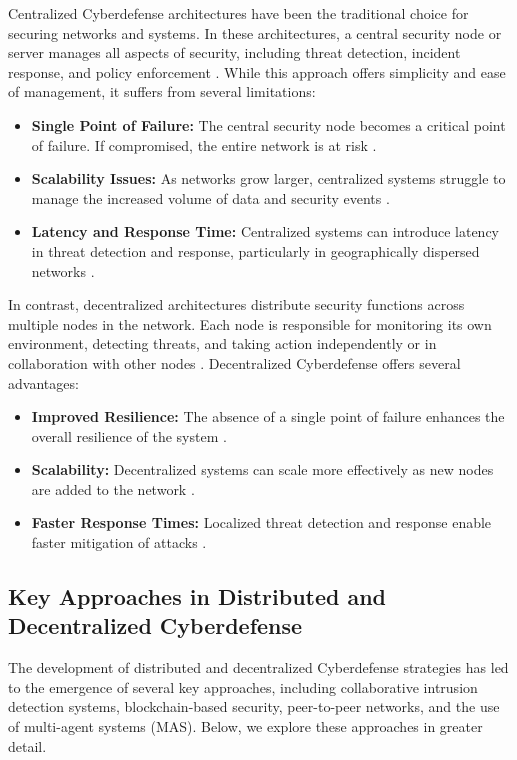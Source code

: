 Centralized Cyberdefense architectures have been the traditional choice for securing networks and systems. In these architectures, a central security node or server manages all aspects of security, including threat detection, incident response, and policy enforcement \cite{Jansen2011}. While this approach offers simplicity and ease of management, it suffers from several limitations:

\begin{itemize}
    \item \textbf{Single Point of Failure:} The central security node becomes a critical point of failure. If compromised, the entire network is at risk \cite{Mell2011}.
    \item \textbf{Scalability Issues:} As networks grow larger, centralized systems struggle to manage the increased volume of data and security events \cite{Xu2019}.
    \item \textbf{Latency and Response Time:} Centralized systems can introduce latency in threat detection and response, particularly in geographically dispersed networks \cite{Benet2014}.
\end{itemize}

In contrast, decentralized architectures distribute security functions across multiple nodes in the network. Each node is responsible for monitoring its own environment, detecting threats, and taking action independently or in collaboration with other nodes \cite{Xu2019}. Decentralized Cyberdefense offers several advantages:

\begin{itemize}
    \item \textbf{Improved Resilience:} The absence of a single point of failure enhances the overall resilience of the system \cite{Zohar2015}.
    \item \textbf{Scalability:} Decentralized systems can scale more effectively as new nodes are added to the network \cite{Xu2019}.
    \item \textbf{Faster Response Times:} Localized threat detection and response enable faster mitigation of attacks \cite{Benet2014}.
\end{itemize}

\subsection{Key Approaches in Distributed and Decentralized Cyberdefense}

The development of distributed and decentralized Cyberdefense strategies has led to the emergence of several key approaches, including collaborative intrusion detection systems, blockchain-based security, peer-to-peer networks, and the use of multi-agent systems (MAS). Below, we explore these approaches in greater detail.

